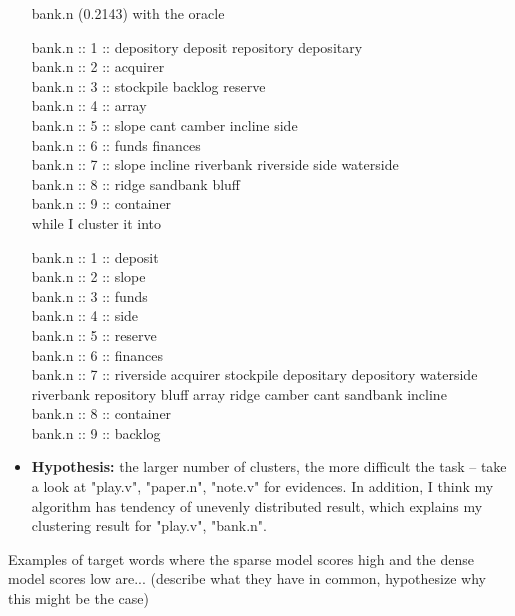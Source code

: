 \documentclass[12pt]{article}
\begin{document}
\begin{itemize}
	 bank.n (0.2143) with the oracle
	 
	 bank.n :: 1 :: depository deposit repository depositary \\
	 bank.n :: 2 :: acquirer \\
	 bank.n :: 3 :: stockpile backlog reserve \\
	 bank.n :: 4 :: array \\
	 bank.n :: 5 :: slope cant camber incline side\\
	 bank.n :: 6 :: funds finances\\
	 bank.n :: 7 :: slope incline riverbank riverside side waterside\\
	 bank.n :: 8 :: ridge sandbank bluff\\
	 bank.n :: 9 :: container\\
	 
	 while I cluster it into
	 
	 bank.n :: 1 :: deposit \\
	 bank.n :: 2 :: slope \\
	 bank.n :: 3 :: funds \\
	 bank.n :: 4 :: side \\
	 bank.n :: 5 :: reserve \\
	 bank.n :: 6 :: finances \\
	 bank.n :: 7 :: riverside acquirer stockpile depositary depository waterside riverbank repository bluff array ridge camber cant sandbank incline \\
	 bank.n :: 8 :: container \\
	 bank.n :: 9 :: backlog\\
	 \item 
\textbf{ Hypothesis:} the larger number of clusters, the more difficult the task -- take a look at "play.v", "paper.n", "note.v" for evidences. In addition, I think my algorithm has tendency of  unevenly distributed result, which explains my clustering result for "play.v", "bank.n".

\end{itemize}
	 


Examples of target words where the sparse model scores high and the dense model scores low are... (describe what they have in common, hypothesize why this might be the case)
\end{document}
